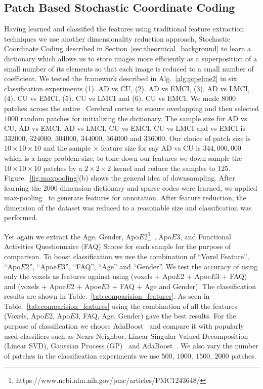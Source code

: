 \subsection{Patch Based  Stochastic Coordinate Coding}
\label{subsec:patch_based_scc}
Having learned and classified the features using traditional feature extraction techniques we use another dimensionality reduction approach, Stochastic Coordinate Coding described in Section~\ref{sec:theoritical_background} to learn a dictionary which allows us to store images more efficiently as a superposition of a small number of its elements so that each image is reduced to a small number of coefficient. 
We tested the framework described in Alg.~\ref{alg:pipeline2} in six classification experiments (1). AD vs CU, (2). AD vs EMCI, (3). AD vs LMCI, (4). CU vs EMCI, (5). CU vs LMCI and (6). CU vs EMCI. We made $ 8000 $ patches across the entire \FDGPET~Cerebral cortex to ensure overlapping and then selected $ 1000 $ random patches for initializing the dictionary. The sample size for AD vs CU, AD vs EMCI, AD vs LMCI, CU vs EMCI, CU vs LMCI and  vs EMCI is $ 332000 $, $ 324000 $, $ 304000 $, $ 344000 $,  $ 364000 $ and $ 336000 $. Our choice of patch size is $ 10\times 10\times 10 $ and the sample $ \times $ feature size for say AD vs CU is $ 344,000,000 $ which is a huge problem size, to tone down our features we down-sample the $ 10\times 10\times 10 $ patches by a $ 2\times 2\times 2 $ kernel and reduce the samples to $ 125 $. Figure.~\ref{fig:maxpooling}(b) shows the general idea of downsampling. After learning the 2000 dimension dictionary and sparse codes were learned, we applied max-pooling~\citep{scherer2010evaluation} to generate features for annotation. After feature reduction, the dimension of the dataset was reduced to a reasonable size and classification was performed.

Yet again we extract the Age, Gender, Apo$E$2\footnote{https://www.ncbi.nlm.nih.gov/pmc/articles/PMC1243648/}~\citep{ghebranious2005detection,genin2011apoe}, Apo$E$3, and Functional Activities Questionnaire (FAQ) Scores for each sample for the purpose of comparison. To boost classification we use the combination of ``Voxel Feature'', ``Apo$E$2'', ``Apoe$E$3'', ``FAQ'', ``Age'' and ``Gender''. We test the accuracy of using only the voxels as features against using (voxels + Apo$ E $2 + Apoe$E$3 + FAQ) and (voxels + Apoe$E$2 + Apoe$ E $3 + FAQ + Age and Gender). The classification results are shown in Table.~\ref{tab:comparision_features}.
As seen in  Table.~\ref{tab:comparision_features} using the combination of all the features (Voxels, Apo$E$2, Apo$E$3, FAQ, Age, Gender) gave the best results.
For the purpose of classification we choose AdaBoost~\citep*{shawe2004kernel} and compare it with popularly used classifiers such as Nears Neighbor, Linear Singular Valued Decomposition (Linear SVD), Gaussian Process (GP)~\citep{rasmussen2006gaussian} and AdaBoost~\citep{rojas2009adaboost}. 
We also vary the number of patches in the classification experiments we use $ 500,~1000,~1500,~2000$ patches. 



